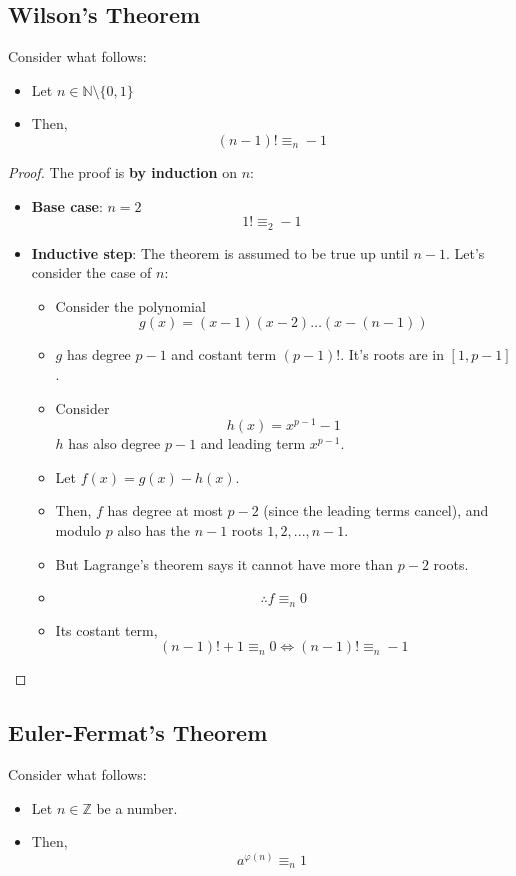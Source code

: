 \subsection{Wilson's Theorem}\label{wilson_th}
\begin{theorem}
    Consider what follows:
    \begin{itemize}
        \item Let $n \in \mathbb{N} \setminus \{0,1\}$
        \item Then, \[(n-1)! \equiv_{n} -1\]
    \end{itemize}
\end{theorem}
\begin{proof}
    The proof is \textbf{by induction} on $n$:
    \begin{itemize}
        \item \textbf{Base case}: $n = 2$
        \[1! \equiv_{2} -1\]
        \item \textbf{Inductive step}:
        The theorem is assumed to be true up until $n - 1$. Let's consider the case of $n$:
        \begin{itemize}
            \item Consider the polynomial \[g(x) = (x-1)(x-2) \dots (x - (n-1))\]
            \item $g$ has degree $p-1$ and costant term $(p-1)!$. It's roots are in $[1,p-1]$.
            \item Consider \[h(x) = x^{p-1} - 1\] $h$ has also degree $p-1$ and leading term $x^{p-1}$.
            \item Let $f(x) = g(x) - h(x)$.
            \item Then, $f$ has degree at most $p - 2$ (since the leading terms cancel), and modulo $p$ also has the $n - 1$ roots $1, 2, ..., n - 1$.
            \item But Lagrange's theorem says it cannot have more than $p - 2$ roots.
            \item \[\therefore f \equiv_{n} 0\]
            \item Its costant term, \[(n-1)! + 1 \equiv_{n} 0 \iff (n-1)! \equiv_{n} -1\]
        \end{itemize}
    \end{itemize}
\end{proof}

\subsection{Euler-Fermat's Theorem}\label{euler_fermat_th}
\begin{theorem}
    Consider what follows:
    \begin{itemize}
        \item Let $n \in \mathbb{Z}$ be a number.
        \item Then, \[a^{\varphi(n)} \equiv_{n} 1\]
    \end{itemize}
\end{theorem}

